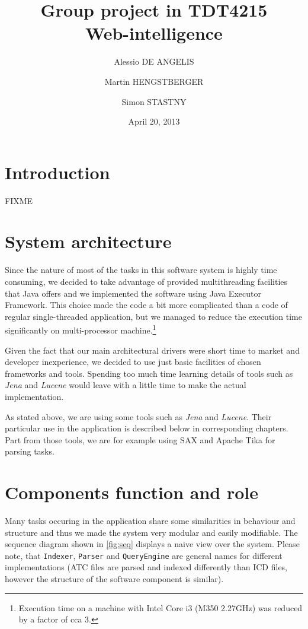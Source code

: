 \documentclass{article}
\begin{document}
\title{Group project in TDT4215\\
Web-intelligence}

\date{April 20, 2013}

\author{
  Alessio DE ANGELIS\and 
  Martin HENGSTBERGER\and
  Simon STASTNY}

\maketitle

\tableofcontents
\newpage


\section{Introduction}

FIXME

\section{System architecture}

Since the nature of most of the tasks in this software system is highly time consuming, we decided to take advantage of provided multithreading facilities that Java offers and we implemented the software using Java Executor Framework. This choice made the code a bit more complicated than a code of regular single-threaded application, but we managed to reduce the execution time significantly on multi-processor machine.\footnote{Execution time on a machine with Intel Core i3 (M350 2.27GHz) was reduced by a factor of cca 3.}

Given the fact that our main architectural drivers were short time to market and developer inexperience, we decided to use just basic facilities of chosen frameworks and tools. Spending too much time learning details of tools such as \emph{Jena} and \emph{Lucene} would leave with a little time to make the actual implementation.

As stated above, we are using some tools such as \emph{Jena} and \emph{Lucene}. Their particular use in the application is described below in corresponding chapters. Part from those tools, we are for example using SAX and Apache Tika for parsing tasks.

\section{Components function and role}
Many tasks occuring in the application share some similarities in behaviour and structure and thus we made the system very modular and easily modifiable. The sequence diagram shown in \ref{fig:seq} displays a naive view over the system. Please note, that \texttt{Indexer}, \texttt{Parser} and \texttt{QueryEngine} are general names for different implementations (ATC files are parsed and indexed differently than ICD files, however the structure of the software component is similar).
\end{document}
